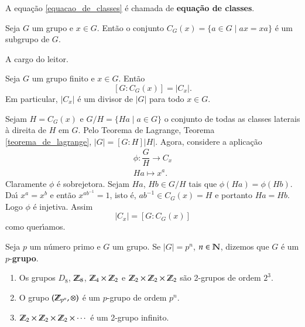 A equa\c{c}\~ao \eqref{equacao_de_classes} \'e chamada de \textbf{equa\c{c}\~ao de classes}.

\begin{proposicao}
	Seja $G$ um grupo e $x \in G$. Ent\~ao o conjunto $C_G(x) = \{a \in G \mid ax = xa\}$ \'e um subgrupo de $G$.
\end{proposicao}
\begin{prova}
	A cargo do leitor.
\end{prova}

\begin{proposicao}\label{ordem_da_classe_de_conjugacao}
	Seja $G$ um grupo finito e $x \in G$. Ent\~ao
	\[
		[G : C_G(x)] = |C_x|.
	\]
	Em particular, $|C_x|$ \'e um divisor de $|G|$ para todo $x \in G$.
\end{proposicao}
\begin{prova}
	Sejam $H = C_G(x)$ e $G/H = \{Ha \mid a \in G\}$ o conjunto de todas as classes laterais \`a direita de $H$ em $G$. Pelo Teorema de Lagrange, Teorema \ref{teorema_de_lagrange}, $|G| = [G : H]|H|$. Agora, considere a aplica\c{c}\~ao
	\begin{align*}
		\phi : \dfrac{G}{H} \to C_x\\
		Ha \mapsto x^a.
	\end{align*}
	Claramente $\phi$ \'e sobrejetora. Sejam $Ha$, $Hb \in G/H$ tais que $\phi(Ha) = \phi(Hb)$. Da{\'\i} $x^a = x^b$ e ent\~ao $x^{ab^{-1}} = 1$, isto \'e, $ab^{-1} \in C_G(x) = H$ e portanto $Ha = Hb$. Logo $\phi$ \'e injetiva. Assim
	\[
		|C_x| = [G : C_G(x)]
	\]
	como quer{\'\i}amos.
\end{prova}

\begin{definicao}
	Seja $p$ um n\'umero primo e $G$ um grupo. Se $|G| = p^n$, $n \in \mathbb{N}$, dizemos que $G$ \'e um $p$-\textbf{grupo}.
\end{definicao}

\begin{exemplos}
	\begin{enumerate}[label=({\arabic*})]
		\item Os grupos $D_8$, $\mathbb{Z}_8$, $\mathbb{Z}_4\times \mathbb{Z}_2$ e $\mathbb{Z}_2\times\mathbb{Z}_2\times\mathbb{Z}_2$ s\~ao 2-grupos de ordem $2^3$.

		\item O grupo $(\mathbb{Z}_{p^n}, \otimes)$ \'e um $p$-grupo de ordem $p^n$.

		\item $\mathbb{Z}_2\times\mathbb{Z}_2\times\mathbb{Z}_2\times\cdots$ \'e um 2-grupo infinito.
	\end{enumerate}
\end{exemplos}

